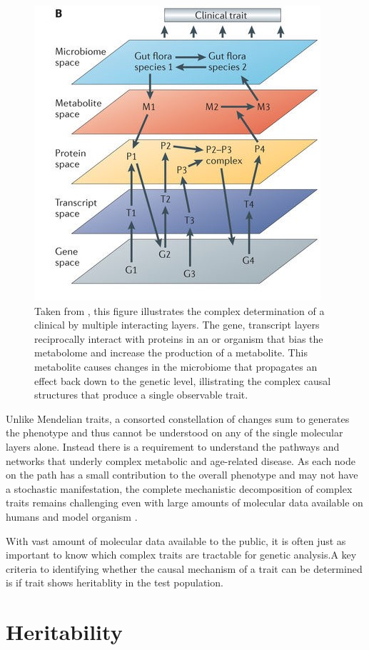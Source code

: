 \documentclass[a4paper]{book}
\begin{document}
	\begin{figure}[htb]
		\centering
		\includegraphics[width=0.5\linewidth]{1.Introduction_Figures/nrg3575-f1.jpg}
		\caption{Taken from \citeauthor{Civelek2014SystemsTraits}, this figure illustrates the complex determination of a clinical by multiple interacting layers. The gene, transcript layers  reciprocally interact with proteins in an or organism that bias the metabolome and increase the production of a metabolite. This metabolite causes changes in the microbiome that propagates an effect back down to the genetic level, illistrating the complex causal structures that produce a single observable trait. }
		\label{Multi-Layer Trait Determination}
	\end{figure}
	
	Unlike Mendelian traits, a consorted constellation of changes sum to generates the phenotype and thus cannot be understood on any of the single molecular layers alone. Instead there is a requirement to understand the pathways and networks that underly complex metabolic and age-related disease. As each node on the path has a small contribution to the overall phenotype and may not have a stochastic manifestation, the complete mechanistic decomposition of complex traits remains challenging even with large amounts of molecular data available on humans and model organism \citep{Civelek2014SystemsTraits}. 
	
	With vast amount of molecular data available to the public, it is often just as important to know which complex traits are tractable for genetic analysis.A key criteria to identifying whether the causal mechanism of a trait can be determined is if trait shows heritablity in the test population.
	
	
	\section{Heritability}
	
\end{document}
